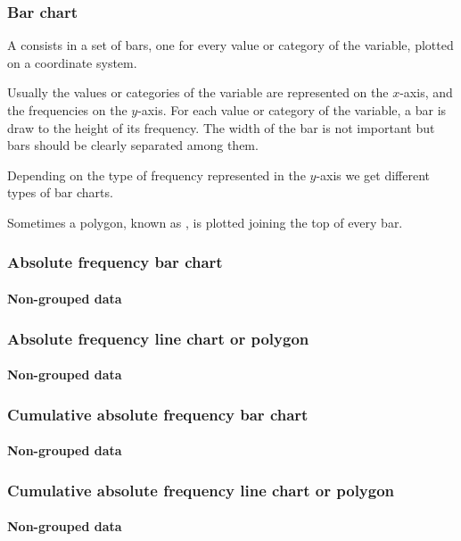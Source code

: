 \begin{frame}
\frametitle{Bar chart}
A  consists in a set of bars, one for every value or category of the variable, plotted on a
coordinate system.

Usually the values or categories of the variable are represented on the $x$-axis, and the frequencies on the $y$-axis. 
For each value or category of the variable, a bar is draw to the height of its frequency.
The width of the bar is not important but bars should be clearly separated among them. 

Depending on the type of frequency represented in the $y$-axis we get different types of bar charts.
 
Sometimes a polygon, known as , is plotted joining the top of every bar.
\end{frame}



\begin{frame}
\frametitle{Absolute frequency bar chart}
\framesubtitle{Non-grouped data}
\begin{center}
\scalebox{0.6}{} 
\end{center}
\end{frame}


\begin{frame}
\frametitle{Absolute frequency line chart or polygon}
\framesubtitle{Non-grouped data}
\begin{center}
\scalebox{0.6}{} 
\end{center}
\end{frame}


\begin{frame}
\frametitle{Cumulative absolute frequency bar chart}
\framesubtitle{Non-grouped data}
\begin{center}
\scalebox{0.6}{} 
\end{center}
\end{frame}


\begin{frame}
\frametitle{Cumulative absolute frequency line chart or polygon}
\framesubtitle{Non-grouped data}
\begin{center}
\scalebox{0.6}{} 
\end{center} 
\end{frame}


